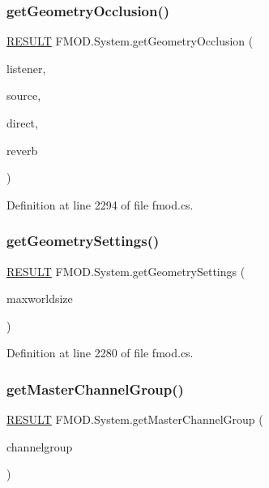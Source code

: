 \subsubsection{\texorpdfstring{get\+Geometry\+Occlusion()}{getGeometryOcclusion()}}
{\footnotesize\ttfamily \hyperlink{namespace_f_m_o_d_a305d1176ef3f8c8815861a60407ac33d}{R\+E\+S\+U\+LT} F\+M\+O\+D.\+System.\+get\+Geometry\+Occlusion (\begin{DoxyParamCaption}\item[{ref \hyperlink{struct_f_m_o_d_1_1_v_e_c_t_o_r}{V\+E\+C\+T\+OR}}]{listener,  }\item[{ref \hyperlink{struct_f_m_o_d_1_1_v_e_c_t_o_r}{V\+E\+C\+T\+OR}}]{source,  }\item[{out float}]{direct,  }\item[{out float}]{reverb }\end{DoxyParamCaption})}



Definition at line 2294 of file fmod.\+cs.

\mbox{\label{class_f_m_o_d_1_1_system_a0bbb002848afa1a5e12553b2cb5ef6c5}} 
\subsubsection{\texorpdfstring{get\+Geometry\+Settings()}{getGeometrySettings()}}
{\footnotesize\ttfamily \hyperlink{namespace_f_m_o_d_a305d1176ef3f8c8815861a60407ac33d}{R\+E\+S\+U\+LT} F\+M\+O\+D.\+System.\+get\+Geometry\+Settings (\begin{DoxyParamCaption}\item[{out float}]{maxworldsize }\end{DoxyParamCaption})}



Definition at line 2280 of file fmod.\+cs.

\mbox{\label{class_f_m_o_d_1_1_system_aa03f6c1ce05970455094eb25af983443}} 
\subsubsection{\texorpdfstring{get\+Master\+Channel\+Group()}{getMasterChannelGroup()}}
{\footnotesize\ttfamily \hyperlink{namespace_f_m_o_d_a305d1176ef3f8c8815861a60407ac33d}{R\+E\+S\+U\+LT} F\+M\+O\+D.\+System.\+get\+Master\+Channel\+Group (\begin{DoxyParamCaption}\item[{out \hyperlink{class_f_m_o_d_1_1_channel_group}{Channel\+Group}}]{channelgroup }\end{DoxyParamCaption})}



